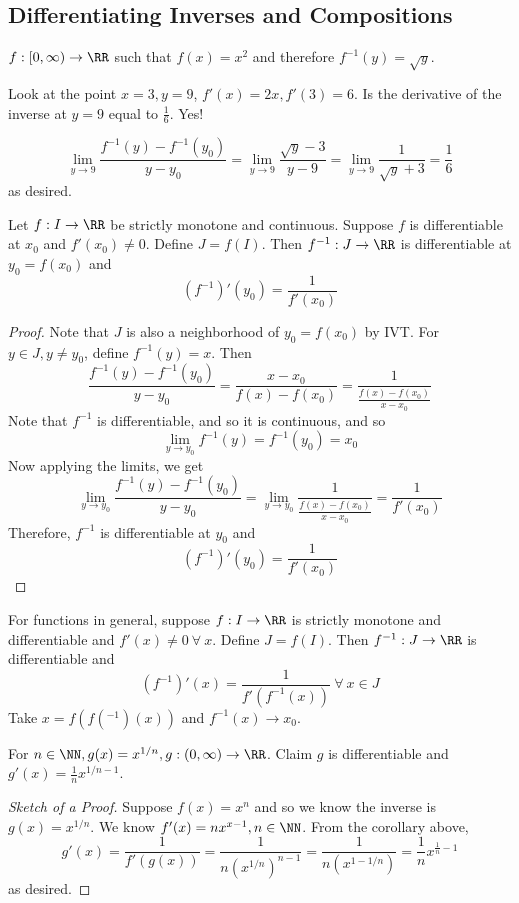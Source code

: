 \documentclass[12pt]{scrartcl}
\begin{document}
\subsection{Differentiating Inverses and Compositions}

\begin{example}
  $f: [0, \infty) \to \RR$ such that $f(x) = x^2$ and therefore $f^{-1}(y) = \sqrt{y}$.

  Look at the point $x=3, y=9$, $f'(x) = 2x, f'(3) = 6$. Is the derivative of the 
  inverse at $y=9$ equal to $\frac{1}{6}$. Yes!  

  \[\lim_{y \to 9} \frac{f^{-1}(y) - f^{-1}(y_0)}{y - y_0} = \lim_{y\to 9}\frac{\sqrt{y} - 3}{y - 9} = \lim_{y\to 9} \frac{1}{\sqrt{y} + 3} = \frac{1}{6}\]
  as desired.
\end{example}

\begin{theorem}
  Let $f: I \to \RR$ be strictly monotone and continuous. 
  Suppose $f$ is differentiable at $x_0$ and $f'(x_0) \neq 0$. 
  Define $J = f(I)$. Then $f^{-1}: J \to \RR$ is differentiable at $y_0 = f(x_0)$ 
  and
  \[(f^{-1})'(y_0) = \frac{1}{f'(x_0)}\]

  \begin{proof}
    Note that $J$ is also a neighborhood of $y_0 = f(x_0)$ by IVT.
    For $y \in J, y \neq y_0$, define $f^{-1}(y) = x$. Then 
    \[\frac{f^{-1}(y) - f^{-1}(y_0)}{y - y_0} = \frac{x-x_0}{f(x) - f(x_0)} = \frac{1}{\frac{f(x) - f(x_0)}{x-x_0}}\]
    Note that $f^{-1}$ is differentiable, and so it is continuous, and so 
    \[\lim_{y\to y_0}f^{-1}(y) = f^{-1}(y_0) = x_0\]
    Now applying the limits, we get 
    \[\lim_{y\to y_0}\frac{f^{-1}(y) - f^{-1}(y_0)}{y-y_0} = \lim_{y\to y_0}\frac{1}{\frac{f(x) - f(x_0)}{x-x_0}} = \frac{1}{f'(x_0)}\]
    Therefore, $f^{-1}$ is differentiable at $y_0$ and
    \[(f^{-1})'(y_0) = \frac{1}{f'(x_0)}\]
  \end{proof}
\end{theorem}

\begin{corollary}
  For functions in general, suppose $f: I \to \RR$ is strictly monotone and differentiable and 
  $f'(x) \neq 0 \ \forall \ x$. Define $J = f(I)$. Then 
  $f^{-1}: J \to \RR$ is differentiable and
  \[(f^{-1})'(x) = \frac{1}{f'(f^{-1}(x))} \ \forall \ x \in J\] 
  Take $x = f(f(^{-1})(x))$ and $f^{-1}(x) \to x_0$.
\end{corollary}

\begin{lemma}
  For $n \in \NN, g(x) = x^{1/n}, g: (0, \infty) \to \RR$. Claim 
  $g$ is differentiable and $g'(x) = \frac{1}{n}x^{1/n - 1}$.
  \begin{proof}[Sketch of a Proof]
    Suppose $f(x) = x^n$ and so we know the inverse is $g(x) = x^{1/n}$. We know 
    $f'(x) = nx^{x-1}, n \in \NN$. From the corollary above, 
    \[g'(x) = \frac{1}{f'(g(x))} = \frac{1}{n(x^{1/n})^{n-1}} = \frac{1}{n(x^{1-1/n})} = \frac{1}{n}x^{\frac{1}{n} - 1}\]
    as desired.
  \end{proof}
\end{lemma}
\end{document}
